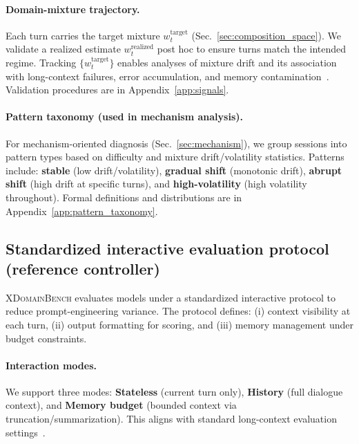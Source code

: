 \paragraph{Domain-mixture trajectory.}
Each turn carries the target mixture $w_t^{\text{target}}$ (Sec.~\ref{sec:composition_space}).
We validate a realized estimate $w_t^{\text{realized}}$ post hoc to ensure turns match the intended regime.
Tracking $\{w_t^{\text{target}}\}$ enables analyses of mixture drift and its association with long-context failures, error accumulation, and memory contamination~\citep{bai-etal-2024-longbench,liu-etal-2024-lost}.
Validation procedures are in Appendix~\ref{app:signals}.

\paragraph{Pattern taxonomy (used in mechanism analysis).}
For mechanism-oriented diagnosis (Sec.~\ref{sec:mechanism}), we group sessions into pattern types based on difficulty and mixture drift/volatility statistics.
Patterns include: \textbf{stable} (low drift/volatility), \textbf{gradual shift} (monotonic drift), \textbf{abrupt shift} (high drift at specific turns), and \textbf{high-volatility} (high volatility throughout).
Formal definitions and distributions are in Appendix~\ref{app:pattern_taxonomy}.




\subsection{Standardized interactive evaluation protocol (reference controller)}
\label{sec:protocol}

\textsc{XDomainBench} evaluates models under a standardized interactive protocol to reduce prompt-engineering variance.
The protocol defines: (i) context visibility at each turn, (ii) output formatting for scoring, and (iii) memory management under budget constraints.

\paragraph{Interaction modes.}
We support three modes: \textbf{Stateless} (current turn only), \textbf{History} (full dialogue context), and \textbf{Memory budget} (bounded context via truncation/summarization).
This aligns with standard long-context evaluation settings~\citep{bai-etal-2024-longbench,liu-etal-2024-lost}.

